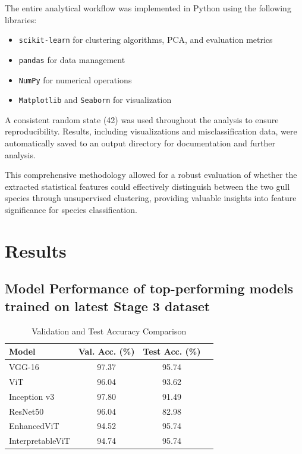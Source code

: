 \documentclass[a4paper,12pt]{report}
\begin{document}
The entire analytical workflow was implemented in Python using the following libraries:

\begin{itemize}
    \item \texttt{scikit-learn} for clustering algorithms, PCA, and evaluation metrics
    \item \texttt{pandas} for data management
    \item \texttt{NumPy} for numerical operations
    \item \texttt{Matplotlib} and \texttt{Seaborn} for visualization
\end{itemize}
A consistent random state (42) was used throughout the analysis to ensure reproducibility. Results, including visualizations and misclassification data, were automatically saved to an output directory for documentation and further analysis.

This comprehensive methodology allowed for a robust evaluation of whether the extracted statistical features could effectively distinguish between the two gull species through unsupervised clustering, providing valuable insights into feature significance for species classification.

\chapter{Results}

\section{Model Performance of top-performing models trained on latest Stage 3 dataset}

\begin{table}[H]
    \centering
    \caption{Validation and Test Accuracy Comparison}
    \label{tab:val_test_comparison}
    \begin{tabular}{lccc}
    \toprule
    \textbf{Model} & \textbf{Val. Acc. (\%)} & \textbf{Test Acc. (\%)} \\
    \midrule
    VGG-16  & 97.37 & 95.74 \\
    ViT & 96.04 & 93.62 \\
    Inception v3 & 97.80 & 91.49  \\
    ResNet50 & 96.04 & 82.98 \\
    EnhancedViT & 94.52 & 95.74  \\
    InterpretableViT & 94.74 & 95.74 \\
    \bottomrule
    \end{tabular}
\end{table}
\end{document}
